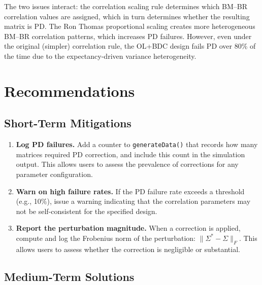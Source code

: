 \documentclass[11pt]{article}
\begin{document}
The two issues interact: the correlation scaling rule determines
which BM--BR correlation values are assigned, which in turn
determines whether the resulting matrix is PD. The Ron Thomas
proportional scaling creates more heterogeneous BM--BR
correlation patterns, which increases PD failures. However,
even under the original (simpler) correlation rule, the OL+BDC
design fails PD over 80\% of the time due to the
expectancy-driven variance heterogeneity.

\section{Recommendations}

\subsection{Short-Term Mitigations}

\begin{enumerate}
\item \textbf{Log PD failures.} Add a counter to
  \texttt{generateData()} that records how many matrices
  required PD correction, and include this count in the
  simulation output. This allows users to assess the
  prevalence of corrections for any parameter configuration.

\item \textbf{Warn on high failure rates.} If the PD failure
  rate exceeds a threshold (e.g., 10\%), issue a warning
  indicating that the correlation parameters may not be
  self-consistent for the specified design.

\item \textbf{Report the perturbation magnitude.} When a
  correction is applied, compute and log the Frobenius norm of
  the perturbation:
  $\|\Sigma^* - \Sigma\|_F$. This allows users to assess
  whether the correction is negligible or substantial.
\end{enumerate}

\subsection{Medium-Term Solutions}
\end{document}
